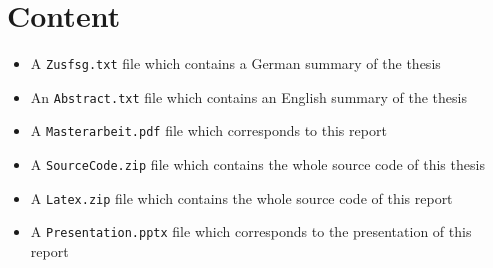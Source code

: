 \chapter{ Content}

\begin{itemize}
	\item A \texttt{Zusfsg.txt} file which contains a German summary of the thesis
	\item An \texttt{Abstract.txt} file which contains an English summary of the thesis
	\item A \texttt{Masterarbeit.pdf} file which corresponds to this report
	\item A \texttt{SourceCode.zip} file which contains the whole source code of this thesis
	\item A \texttt{Latex.zip} file which contains the whole source code of this report
	\item A \texttt{Presentation.pptx} file which corresponds to the presentation of this report
\end{itemize}